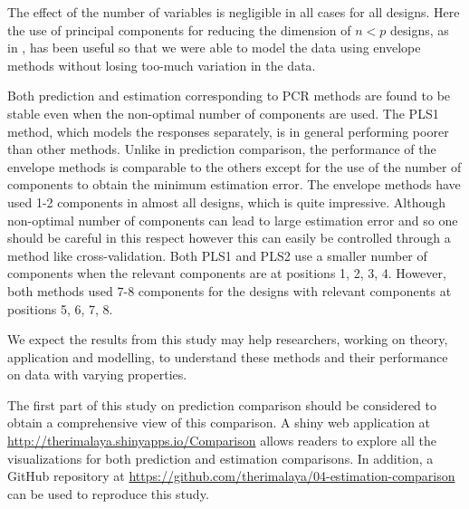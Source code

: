 \documentclass[12pt,3p,authoryear]{elsarticle}
\begin{document}
The effect of the number of variables is negligible in all cases for all designs. Here the use of principal components for reducing the dimension of \(n<p\) designs, as in \citet{rimal2019pred}, has been useful so that we were able to model the data using envelope methods without losing too-much variation in the data.

Both prediction and estimation corresponding to PCR methods are found to be stable even when the non-optimal number of components are used. The PLS1 method, which models the responses separately, is in general performing poorer than other methods. Unlike in prediction comparison, the performance of the envelope methods is comparable to the others except for the use of the number of components to obtain the minimum estimation error. The envelope methods have used 1-2 components in almost all designs, which is quite impressive. Although non-optimal number of components can lead to large estimation error and so one should be careful in this respect however this can easily be controlled through a method like cross-validation. Both PLS1 and PLS2 use a smaller number of components when the relevant components are at positions 1, 2, 3, 4. However, both methods used 7-8 components for the designs with relevant components at positions 5, 6, 7, 8.

We expect the results from this study may help researchers, working on theory, application and modelling, to understand these methods and their performance on data with varying properties.

The first part of this study \citep{rimal2019pred} on prediction comparison should be considered to obtain a comprehensive view of this comparison. A shiny \citep{shiny} web application at \url{http://therimalaya.shinyapps.io/Comparison} allows readers to explore all the visualizations for both prediction and estimation comparisons. In addition, a GitHub repository at \url{https://github.com/therimalaya/04-estimation-comparison} can be used to reproduce this study.

\hypertarget{refs}{}


\renewcommand\refname{References}

\end{document}
